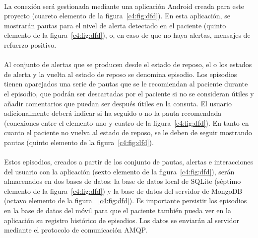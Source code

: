 \paragraph{}
La conexión será gestionada mediante una aplicación Android creada para este proyecto (cuareto elemento de la figura~\ref{c4:fig:dfd}). En esta aplicación, se mostrarán pautas para el nivel de alerta detectado en el paciente (quinto elemento de la figura~\ref{c4:fig:dfd}), o, en caso de que no haya alertas, mensajes de refuerzo positivo.

\paragraph{}
Al conjunto de alertas que se producen desde el estado de reposo, el o los estados de alerta y la vuelta al estado de reposo se denomina episodio. Los episodios tienen aparejados una serie de pautas que se le recomiendan al paciente durante el episodio, que podrán ser descartadas por el paciente si no se consideran útiles y añadir comentarios que puedan ser después útiles en la consuta. El usuario adicionalmente deberá indicar si ha seguido o no la pauta recomendada (conexiones entre el elemento uno y cuatro de la figura~\ref{c4:fig:dfd}). En tanto en cuanto el paciente no vuelva al estado de reposo, se le deben de seguir mostrando pautas (quinto elemento de la figura~\ref{c4:fig:dfd}).

\paragraph{}
Estos episodios, creados a partir de los conjunto de pautas, alertas e interacciones del usuario con la aplicación (sexto elemento de la figura~\ref{c4:fig:dfd}), serán almacenados en dos bases de datos: la base de datos local de SQLite (séptimo elemento de la figura~\ref{c4:fig:dfd}) y la base de datos del servidor de MongoDB (octavo elemento de la figura ~\ref{c4:fig:dfd}). Es importante persistir los episodios en la base de datos del móvil para que el paciente también pueda ver en la aplicación su registro histórico de episodios. Los datos se enviarán al servidor mediante el protocolo de comunicación AMQP.

